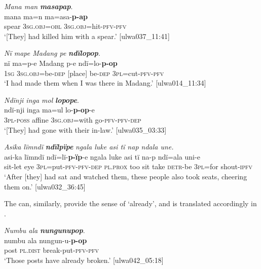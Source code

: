 \ea%
    \label{ex:verbs:42}
          \textit{Mana man} \textbf{\textit{masapap}}.\\
\gll mana  ma=n      ma=asa-\textbf{p-ap}\\
    spear  3\textsc{sg.obj=obl}  3\textsc{sg.obj}=hit-\textsc{pfv-pfv}\\
\glt `[They] had killed him with a spear.’ [ulwa037\_11:41]
\z

\ea%
    \label{ex:verbs:43}
          \textit{Nï mape Madang pe} \textbf{\textit{ndïlopop}}.\\
\gll nï    ma=p-e      Madang  p-e   ndï=lo-\textbf{p-op}\\
    1\textsc{sg}  3\textsc{sg.obj}=be\textsc{{}-dep}  [place]    be\textsc{{}-dep}  3\textsc{pl}=cut-\textsc{pfv-pfv}\\
\glt `I had made them when I was there in Madang.’ [ulwa014\_11:34]
\z

\ea%
    \label{ex:verbs:44}
         \textit{Ndïnji inga mol} \textbf{\textit{lopope}}.\\
\gll ndï-nji    inga  ma=ul       lo-\textbf{p-op}{}-e\\
    3\textsc{pl-poss}  affine  3\textsc{sg.obj}=with  go-\textsc{pfv-pfv-dep}\\
\glt `[They] had gone with their in-law.’ [ulwa035\_03:33]
\z

\ea%
    \label{ex:verbs:45}
          \textit{Asika lïmndï} \textbf{\textit{ndïlpïpe}} \textit{ngala luke asi tï nap ndala une.}\\
   \gll asi-ka  lïmndï  ndï=lï-\textbf{p-ïp}{}-e      ngala    luke   asi   tï    na-p    ndï=ala  uni-e\\
    sit-let  eye    \textsc{3pl}=put-\textsc{pfv-pfv-dep}  \textsc{pl.prox}  too     sit    take  \textsc{detr}{}-be  3\textsc{pl}=for  shout-\textsc{ipfv}\\

\glt `After [they] had sat and watched them, these people also took seats, cheering them on.’ [ulwa032\_36:45]
\z

The  can, similarly, provide the sense of ‘already’, and is translated accordingly in .

\ea%
    \label{ex:verbs:46}
          \textit{Numbu ala} \textbf{\textit{nungunupop}}.\\
\gll numbu  ala       nungun-u-\textbf{p-op}\\
    post   \textsc{pl.dist}  break-put-\textsc{pfv-pfv}\\
\glt `Those posts have already broken.’ [ulwa042\_05:18]
\z

